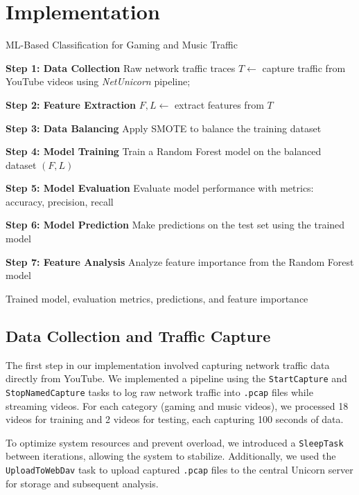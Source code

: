 \section{\mbox{Implementation}} \label{sec:implementation}

\begin{algorithm}[H] 
\caption{ML-Based Classification for Gaming and Music Traffic}
\label{algo:ml_pipeline}
\BlankLine
\textbf{Step 1: Data Collection}\;
Raw network traffic traces $T \gets$ capture traffic from YouTube videos using \emph{NetUnicorn} pipeline;

\textbf{Step 2: Feature Extraction}\;
$F, L \gets$ extract features from $T$\; 

\textbf{Step 3: Data Balancing}\;
Apply SMOTE to balance the training dataset\;

\textbf{Step 4: Model Training}\;
Train a Random Forest model on the balanced dataset $(F, L)$\;

\textbf{Step 5: Model Evaluation}\;
Evaluate model performance with metrics: accuracy, precision, recall\;

\textbf{Step 6: Model Prediction}\;
Make predictions on the test set using the trained model\;

\textbf{Step 7: Feature Analysis}\;
Analyze feature importance from the Random Forest model\;

\BlankLine
\Return Trained model, evaluation metrics, predictions, and feature importance\;
\end{algorithm}

\subsection{Data Collection and Traffic Capture}
The first step in our implementation involved capturing network traffic data directly from YouTube. We implemented a pipeline using the \texttt{StartCapture} and \texttt{StopNamedCapture} tasks to log raw network traffic into \texttt{.pcap} files while streaming videos. For each category (gaming and music videos), we processed 18 videos for training and 2 videos for testing, each capturing 100 seconds of data.

To optimize system resources and prevent overload, we introduced a \texttt{SleepTask} between iterations, allowing the system to stabilize. Additionally, we used the \texttt{UploadToWebDav} task to upload captured \texttt{.pcap} files to the central Unicorn server for storage and subsequent analysis.


